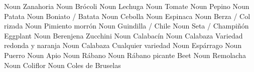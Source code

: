                {}              {Noun}      {Zanahoria}             {}
             {}              {Noun}      {Brócoli}               {}
              {}              {Noun}      {Lechuga}               {}
               {}              {Noun}      {Tomate}                {}
             {}              {Noun}      {Pepino}                {}
               {}              {Noun}      {Patata}                {}
         {}              {Noun}      {Boniato / Batata}      {}
                {}              {Noun}      {Cebolla}               {}
              {}              {Noun}      {Espinaca}              {}
                 {}              {Noun}      {Berza / Col rizada}    {}
          {}              {Noun}      {Pimiento morrón}       {}
         {}              {Noun}      {Guindilla / Chile}     {}
             {}              {Noun}      {Seta / Champiñón}      {}
            {Eggplant}      {Noun}      {Berenjena}             {}
            {Zucchini}      {Noun}      {Calabacín}             {}
              {}              {Noun}      {Calabaza}              {Variedad redonda y naranja}
               {}              {Noun}      {Calabaza}              {Cualquier variedad}
            {}              {Noun}      {Espárrago}             {}
                 {}              {Noun}      {Puerro}                {}
               {}              {Noun}      {Apio}                  {}
               {}              {Noun}      {Rábano}                {}
          {}              {Noun}      {Rábano picante}        {}
             {Beet}          {Noun}      {Remolacha}             {}
          {}              {Noun}      {Coliflor}              {}
      {}              {Noun}      {Coles de Bruselas}     {}
